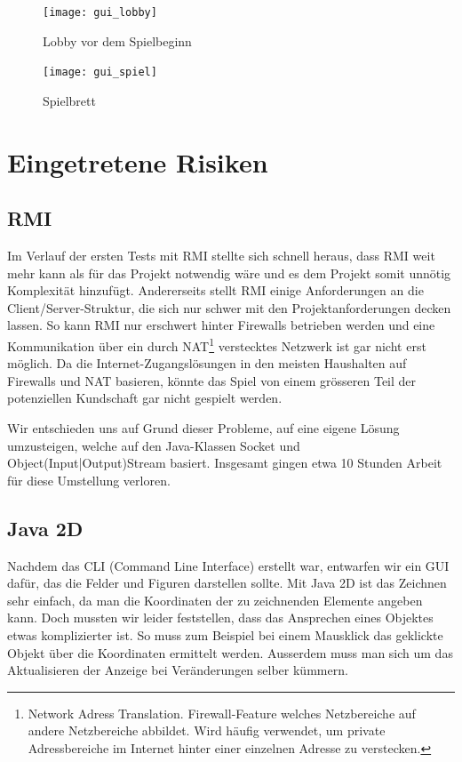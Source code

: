\documentclass[a4paper,12pt,halfparskip,DIV12]{scrartcl}
\begin{document}
\begin{figure}
	\centering
	\texttt{[image: gui\_lobby]}
	\caption{Lobby vor dem Spielbeginn}
	\label{fig:gui_lobby}
\end{figure}

\begin{figure}
	\centering
	\texttt{[image: gui\_spiel]}
	\caption{Spielbrett}
	\label{fig:gui_spiel}
\end{figure}


\clearpage
\section{Eingetretene Risiken} %
\label{eingetretene_risiken}

\subsection{RMI} %
\label{sub:rmi}

Im Verlauf der ersten Tests mit RMI stellte sich schnell heraus, dass RMI weit mehr kann als für das Projekt notwendig wäre und es dem Projekt somit unnötig Komplexität hinzufügt. Andererseits stellt RMI  einige Anforderungen an die Client/Server-Struktur, die sich nur schwer mit den Projektanforderungen decken lassen. So kann RMI nur erschwert hinter Firewalls betrieben werden und eine Kommunikation über ein durch NAT\footnote{Network Adress Translation. Firewall-Feature welches Netzbereiche auf andere Netzbereiche abbildet. Wird häufig verwendet, um private Adressbereiche im Internet hinter einer einzelnen Adresse zu verstecken.} verstecktes Netzwerk ist gar nicht erst möglich. Da die Internet-Zugangslösungen in den meisten Haushalten auf Firewalls und NAT basieren, könnte das Spiel von einem grösseren Teil der potenziellen Kundschaft gar nicht gespielt werden.

Wir entschieden uns auf Grund dieser Probleme, auf eine eigene Lösung umzusteigen, welche auf den Java-Klassen Socket und Object(Input|Output)Stream basiert. Insgesamt gingen etwa 10 Stunden Arbeit für diese Umstellung verloren.

\subsection{Java 2D} %
\label{java_2d}

Nachdem das CLI (Command Line Interface) erstellt war, entwarfen wir ein GUI dafür, das die Felder und Figuren darstellen sollte. Mit Java 2D ist das Zeichnen sehr einfach, da man die Koordinaten der zu zeichnenden Elemente angeben kann. Doch mussten wir leider feststellen, dass das Ansprechen eines Objektes etwas komplizierter ist. So muss zum Beispiel bei einem Mausklick das geklickte Objekt über die Koordinaten ermittelt werden. Ausserdem muss man sich um das Aktualisieren der Anzeige bei Veränderungen selber kümmern.
\end{document}
